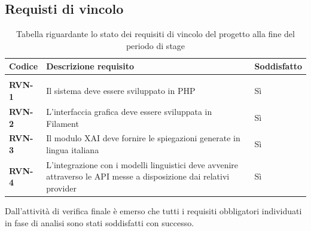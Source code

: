\subsection{Requisti di vincolo}
\keepXColumns
{}
    \begin{longtable}{|l|p{}|l|}
        \hline
        \rowcolor{gold}
        \textbf{Codice} & \textbf{Descrizione requisito} & \textbf{Soddisfatto} \\
        \hline
        \endhead

        \hline
        \rowcolor{white}
        \caption{Tabella riguardante lo stato dei requisiti di vincolo del progetto alla fine del periodo di stage} \label{tab:requisiti_stato_vincolo} \\
        \endlastfoot 

        \textbf{RVN-1} & Il sistema deve essere sviluppato in PHP & Sì \\
        \hline
        \textbf{RVN-2} & L'interfaccia grafica deve essere sviluppata in Filament & Sì \\
        \hline
        \textbf{RVN-3} & Il modulo XAI deve fornire le spiegazioni generate in lingua italiana & Sì \\
        \hline
        \textbf{RVN-4} & L'integrazione con i modelli linguistici deve avvenire attraverso le API messe a disposizione dai relativi provider & Sì \\
        \hline
    \end{longtable}

Dall'attività di verifica finale è emerso che tutti i requisiti obbligatori individuati in fase di analisi sono stati soddisfatti con successo.




\newpage